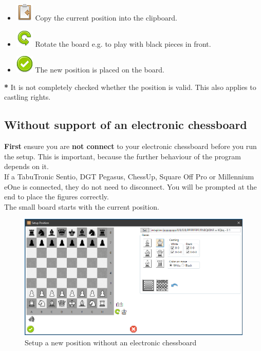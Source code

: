 \documentclass[11pt,a4paper]{article}
\begin{document}
\begin{itemize}
	\item \includegraphics[scale=0.5]{clipboard_sign_out.png} Copy the current position into the clipboard.
	\item \includegraphics[scale=0.5]{arrow_rotate_anticlockwise.png} Rotate the board e.g. to play with black pieces in front.
	\item \includegraphics[scale=0.5]{accept_button.png} The new position is placed on the board.
\end{itemize}

\textbf{{\color{red}*}} It is not completely checked whether the position is valid. This also applies to castling rights.

\subsection{Without support of an electronic chessboard}

\textbf{First} ensure you are \textbf{not connect} to your electronic chessboard before you run the setup. This is important, because the further behaviour of the program depends on it.\\
If a TabuTronic Sentio, DGT Pegasus, ChessUp, Square Off Pro or Millennium eOne is connected, they do not need to disconnect. You will be prompted at the end to place the figures correctly. \\
The small board starts with the current position.

\begin{figure}[H]
	\centering
	\includegraphics[scale=0.5]{SetupPosition2.png}
	\caption{Setup a new position without an electronic chessboard}
	\label{fig:SetupPosition2}
\end{figure}
\end{document}
